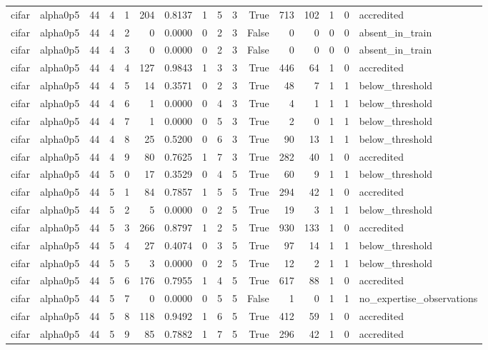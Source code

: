 \begin{tabular}{llrrrrrrrrrrrrrl}
cifar & alpha0p5 & 44 & 4 & 1 & 204 & 0.8137 & 1 & 5 & 3 & True & 713 & 102 & 1 & 0 & accredited \\
cifar & alpha0p5 & 44 & 4 & 2 & 0 & 0.0000 & 0 & 2 & 3 & False & 0 & 0 & 0 & 0 & absent\_in\_train \\
cifar & alpha0p5 & 44 & 4 & 3 & 0 & 0.0000 & 0 & 2 & 3 & False & 0 & 0 & 0 & 0 & absent\_in\_train \\
cifar & alpha0p5 & 44 & 4 & 4 & 127 & 0.9843 & 1 & 3 & 3 & True & 446 & 64 & 1 & 0 & accredited \\
cifar & alpha0p5 & 44 & 4 & 5 & 14 & 0.3571 & 0 & 2 & 3 & True & 48 & 7 & 1 & 1 & below\_threshold \\
cifar & alpha0p5 & 44 & 4 & 6 & 1 & 0.0000 & 0 & 4 & 3 & True & 4 & 1 & 1 & 1 & below\_threshold \\
cifar & alpha0p5 & 44 & 4 & 7 & 1 & 0.0000 & 0 & 5 & 3 & True & 2 & 0 & 1 & 1 & below\_threshold \\
cifar & alpha0p5 & 44 & 4 & 8 & 25 & 0.5200 & 0 & 6 & 3 & True & 90 & 13 & 1 & 1 & below\_threshold \\
cifar & alpha0p5 & 44 & 4 & 9 & 80 & 0.7625 & 1 & 7 & 3 & True & 282 & 40 & 1 & 0 & accredited \\
cifar & alpha0p5 & 44 & 5 & 0 & 17 & 0.3529 & 0 & 4 & 5 & True & 60 & 9 & 1 & 1 & below\_threshold \\
cifar & alpha0p5 & 44 & 5 & 1 & 84 & 0.7857 & 1 & 5 & 5 & True & 294 & 42 & 1 & 0 & accredited \\
cifar & alpha0p5 & 44 & 5 & 2 & 5 & 0.0000 & 0 & 2 & 5 & True & 19 & 3 & 1 & 1 & below\_threshold \\
cifar & alpha0p5 & 44 & 5 & 3 & 266 & 0.8797 & 1 & 2 & 5 & True & 930 & 133 & 1 & 0 & accredited \\
cifar & alpha0p5 & 44 & 5 & 4 & 27 & 0.4074 & 0 & 3 & 5 & True & 97 & 14 & 1 & 1 & below\_threshold \\
cifar & alpha0p5 & 44 & 5 & 5 & 3 & 0.0000 & 0 & 2 & 5 & True & 12 & 2 & 1 & 1 & below\_threshold \\
cifar & alpha0p5 & 44 & 5 & 6 & 176 & 0.7955 & 1 & 4 & 5 & True & 617 & 88 & 1 & 0 & accredited \\
cifar & alpha0p5 & 44 & 5 & 7 & 0 & 0.0000 & 0 & 5 & 5 & False & 1 & 0 & 1 & 1 & no\_expertise\_observations \\
cifar & alpha0p5 & 44 & 5 & 8 & 118 & 0.9492 & 1 & 6 & 5 & True & 412 & 59 & 1 & 0 & accredited \\
cifar & alpha0p5 & 44 & 5 & 9 & 85 & 0.7882 & 1 & 7 & 5 & True & 296 & 42 & 1 & 0 & accredited \\

\end{tabular}
